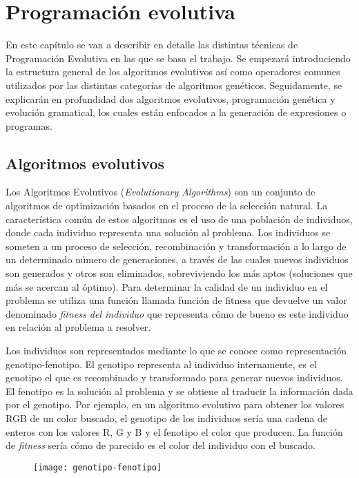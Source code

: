 \chapter{Programación evolutiva}
En este capítulo se van a describir en detalle las distintas técnicas de Programación Evolutiva en las que se basa el trabajo. Se empezará introduciendo la estructura general de los algoritmos evolutivos así como operadores comunes utilizados por las distintas categorías de algoritmos genéticos. Seguidamente, se explicarán en profundidad dos algoritmos evolutivos, programación genética y evolución gramatical, los cuales están enfocados a la generación de expresiones o programas.

\section{Algoritmos evolutivos}
Los Algoritmos Evolutivos (\textit{Evolutionary Algorithms}) son un conjunto de algoritmos de optimización basados en el proceso de la selección natural. La característica común de estos algoritmos es el uso de una población de individuos, donde cada individuo representa una solución al problema. Los individuos se someten a un proceso de selección, recombinación y transformación a lo largo de un determinado número de generaciones, a través de las cuales nuevos individuos son generados y otros son eliminados, sobreviviendo los más aptos (soluciones que más se acercan al óptimo). Para determinar la calidad de un individuo en el problema se utiliza una función llamada función de fitness que devuelve un valor denominado \textit{fitness del individuo} que representa cómo de bueno es este individuo en relación al problema a resolver\cite{cervigon09}.

Los individuos son representados mediante lo que se conoce como representación genotipo-fenotipo. El genotipo representa al individuo internamente, es el genotipo el que es recombinado y transformado para generar nuevos individuos. El fenotipo es la solución al problema y se obtiene al traducir la información dada por el genotipo. Por ejemplo, en un algoritmo evolutivo para obtener los valores RGB de un color buscado, el genotipo de los individuos sería una cadena de enteros con los valores R, G y B y el fenotipo el color que producen. La función de \textit{fitness} sería cómo de parecido es el color del individuo con el buscado.
\begin{figure}[H]
\centering
\texttt{[image: genotipo-fenotipo]}
\end{figure}

